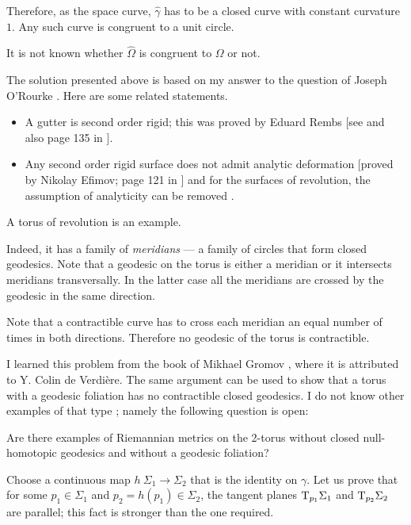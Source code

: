 Therefore, as the space curve,
$\hat\gamma$ has to be a closed curve with constant curvature $1$.
Any such curve is congruent to a unit circle.\qeds

It is not known whether $\hat\Omega$ is congruent to $\Omega$ or not.

The solution presented above is based on my answer 
to the question of Joseph O'Rourke \cite{rourke}.
Here are some related statements.
\begin{itemize}
\item A gutter is second order rigid;
this was proved by Eduard Rembs
[see  and also page 135 in ].
\item Any second order rigid surface does not admit analytic deformation 
[proved by Nikolay Efimov; page 121 in ]
and for the surfaces of revolution, the assumption of analyticity can be removed 
\cite[proved by Idzhad Sabitov, see][]{sabitov}.
\end{itemize}









A torus of revolution is an example.

Indeed, it has a family of {}\emph{meridians} --- a family of circles that form closed geodesics.
Note that a geodesic on the torus is either a meridian
or it intersects meridians transversally.
In the latter case all the meridians are crossed by the geodesic in the same direction.

Note that a contractible curve has to cross each meridian an equal number of times in both directions.
Therefore no geodesic of the torus is contractible.\qeds 


I learned this problem 
from the book of Mikhael Gromov \cite{gromov-MetStr},
where it is attributed to Y. Colin de Verdi\`ere.
The same argument can be used to show that a torus with a geodesic foliation has no contractible closed geodesics.
I do not know other examples of that type \cite{petrunin-torus}; namely the following question is open:

\begin{pr}
Are there examples of Riemannian metrics on the 2-torus without closed null-homotopic geodesics and without a geodesic foliation?
\end{pr}


Choose a continuous map $h\:\Sigma_1\to \Sigma_2$
that is the identity on $\gamma$.
Let us prove that for some $p_1\in \Sigma_1$ and $p_2=h(p_1)\in \Sigma_2$,
the tangent planes $\mathrm{T}_{p_1} \Sigma_1$ and  $\mathrm{T}_{p_2} \Sigma_2$ are parallel;
this fact is stronger than the one required.

